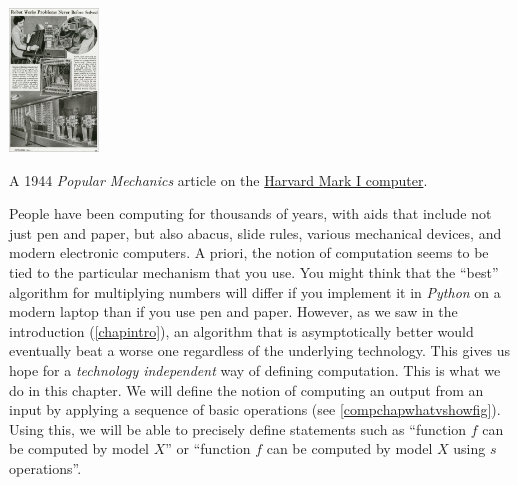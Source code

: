 \begin{marginfigure}
\centering
\includegraphics[width=\linewidth, height=1.5in, keepaspectratio]{../figure/PopularMechanics1944smaller.jpg}
\caption{A 1944 \emph{Popular Mechanics} article on the
\href{http://sites.harvard.edu/~chsi/markone/about.html}{Harvard Mark I
computer}.}
\label{markIcomp}
\end{marginfigure}

People have been computing for thousands of years, with aids that
include not just pen and paper, but also abacus, slide rules, various
mechanical devices, and modern electronic computers. A priori, the
notion of computation seems to be tied to the particular mechanism that
you use. You might think that the ``best'' algorithm for multiplying
numbers will differ if you implement it in \emph{Python} on a modern
laptop than if you use pen and paper. However, as we saw in the
introduction (\cref{chapintro}), an algorithm that is asymptotically
better would eventually beat a worse one regardless of the underlying
technology. This gives us hope for a \emph{technology independent} way
of defining computation. This is what we do in this chapter. We will
define the notion of computing an output from an input by applying a
sequence of basic operations (see \cref{compchapwhatvshowfig}). Using
this, we will be able to precisely define statements such as ``function
\(f\) can be computed by model \(X\)'' or ``function \(f\) can be
computed by model \(X\) using \(s\) operations''.


